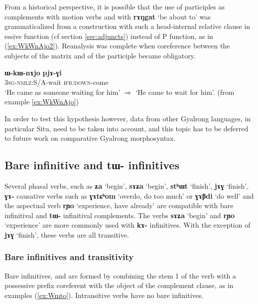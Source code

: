 \documentclass[oneside,a4paper,11pt]{article}
\newcommand{\ipa}[1]{\textbf{\phon#1}} %
\newcommand{\jpg}[2]{\ipa{#1} `#2'} %
\begin{document}
From a historical perspective, it is possible that the use of participles as complements with motion verbs and with \jpg{rɤŋgat}{be about to} was grammaticalized from a construction with such a head-internal relative clause in essive function (cf section \ref{sec:adjuncts}) instead of P function, as in (\ref{ex:WkWnAjo2}). Reanalysis was complete when coreference between the subjects of the matrix and of the participle became obligatory.

\begin{exe}
\ex \label{ex:WkWnAjo2}
\gll 	\ipa{ɯ-kɯ-nɤjo} 	\ipa{pjɤ-ɣi} \\
 \textsc{3sg-nmlz:S/A}-wait \textsc{ifr:down}-come \\
\glt *`He came as someone waiting for him' $\Rightarrow$ `He came to wait for him'. (from example \ref{ex:WkWnAjo})
\end{exe}

In order to test this hypothesis however, data from other Gyalrong languages, in particular Situ, need to be taken into account, and this topic has to be deferred to future work on comparative Gyalrong morphosyntax.

 \subsection{Bare infinitive and \ipa{tɯ-} infinitives} \label{sec:bareinf}
Several phasal verbs, such as \jpg{ʑa}{begin}, \jpg{sɤʑa}{begin}, \jpg{stʰɯt}{finish}, \jpg{jɤɣ}{finish}, \ipa{ɣɤ-} causative verbs such as \jpg{ɣɤtɕʰom}{overdo, do too much} or \jpg{ɣɤβdi}{do well} and the aspectual verb \jpg{rɲo}{experience, have already} are compatible with bare infinitival and \ipa{tɯ-} infinitival complements. The verbs \jpg{sɤʑa}{begin} and \jpg{rɲo}{experience} are more commonly used with \ipa{kɤ-} infinitives. With the exception of \jpg{jɤɣ}{finish}, these verbs are all transitive.


\subsubsection{Bare infinitives and transitivity}
Bare infinitives, and are formed by combining the stem 1 of the verb with a possessive prefix coreferent with the object of the complement clause, as in examples (\ref{ex:Wmto}). Intransitive verbs have no bare infinitives.
\end{document}
